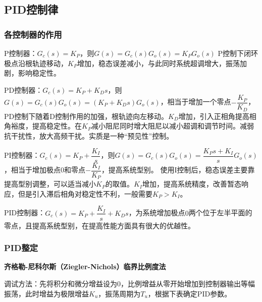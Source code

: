 \documentclass[11pt,a4paper]{ctexart}
\begin{document}
    \subsection{PID控制律}
        \subsubsection{各控制器的作用}
            P控制器：$G_c(s)=K_P$，则$G(s)=G_c(s)G_o(s)=K_PG_o(s)$
            P控制下闭环极点沿根轨迹移动，$K_P$增加，稳态误差减小，与此同时系统超调增大，振荡加剧，影响稳定性。

            PD控制器：$G_c(s)=K_P+K_Ds$，则$G(s)=G_c(s)G_o(s)=(K_P+K_Ds)G_o(s)$，相当于增加一个零点$-\dfrac{K_P}{K_D}$，
            PD控制下随着D控制作用的加强，根轨迹向左移动。$K_D$增加，引入正相角提高相角裕度，提高稳定性。在$K_P$减小阻尼同时增大阻尼以减小超调和调节时间。减弱抗干扰性，放大高频干扰。实质是一种“预见性”控制。

            PI控制器：$G_c(s)=K_P+\dfrac{K_I}{s}$，则$G(s)=G_c(s)G_o(s)=\dfrac{K_Ps+K_I}{s}G_o(s)$，相当于增加极点$0$和零点$-\dfrac{K_I}{K_P}$，提高系统型别。
            使用I控制后，稳态误差主要靠提高型别调整，可以适当减小$K_P$的取值。$K_I$增加，提高系统精度，改善暂态响应，但是引入滞后相角对稳定性不利，一般需要$K_P>K_I$。

            PID控制器：$G_c(s)=K_P+\dfrac{K_I}{s}+K_Ds$，为系统增加极点$0$两个位于左半平面的零点，且提高系统型别，在提高性能方面具有很大的优越性。
        \subsubsection{PID整定}
            \textbf{齐格勒-尼科尔斯（Ziegler-Nichols）临界比例度法}

            调试方法：先将积分和微分增益设为0，比例增益从零开始增加到控制器输出等幅振荡，此时增益为极限增益$K_u$，振荡周期为$T_u$，根据下表确定PID参数。
\end{document}
